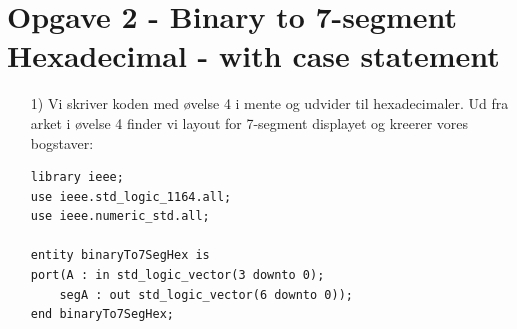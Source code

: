 \section{Opgave 2 - Binary to 7-segment Hexadecimal - with case statement}
\begin{enumerate}
	\item[1)] Vi skriver koden med øvelse 4 i mente og udvider til hexadecimaler. Ud fra arket i øvelse 4 finder vi layout for 7-segment displayet og kreerer vores bogstaver:
\begin{lstlisting}[caption={Behavioral style binær til 7-segment hexadecimal},label={lst:binto7seghexa}]
library ieee;
use ieee.std_logic_1164.all;
use ieee.numeric_std.all;

entity binaryTo7SegHex is
port(A : in std_logic_vector(3 downto 0);
	segA : out std_logic_vector(6 downto 0));
end binaryTo7SegHex;


\end{lstlisting}
\end{enumerate}
